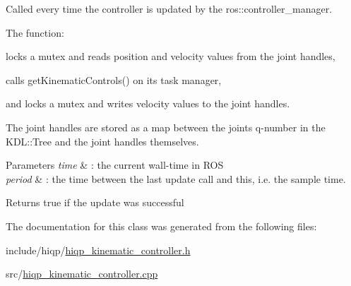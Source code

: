 Called every time the controller is updated by the ros\-::controller\-\_\-manager. 

The function\-: 
\begin{DoxyEnumerate}
\item locks a mutex and reads position and velocity values from the joint handles, 
\item calls get\-Kinematic\-Controls() on its task manager, 
\item and locks a mutex and writes velocity values to the joint handles. 
\end{DoxyEnumerate}The joint handles are stored as a map between the joints q-\/number in the K\-D\-L\-::\-Tree and the joint handles themselves.


\begin{DoxyParams}{Parameters}
{\em time} & \-: the current wall-\/time in R\-O\-S \\
\hline
{\em period} & \-: the time between the last update call and this, i.\-e. the sample time. \\
\hline
\end{DoxyParams}
\begin{DoxyReturn}{Returns}
true if the update was successful 
\end{DoxyReturn}


The documentation for this class was generated from the following files\-:\begin{DoxyCompactItemize}
\item 
include/hiqp/\hyperlink{hiqp__kinematic__controller_8h}{hiqp\-\_\-kinematic\-\_\-controller.\-h}\item 
src/\hyperlink{hiqp__kinematic__controller_8cpp}{hiqp\-\_\-kinematic\-\_\-controller.\-cpp}\end{DoxyCompactItemize}
